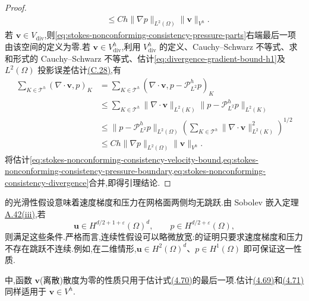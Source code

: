 \begin{proof}
\begin{equation}
\begin{aligned}
  &\leq Ch\|\nabla p\|_{L^2(\Omega)}\|\bm{v}\|_{V^h}.
\end{aligned}
\end{equation}
若 $\bm{v}\in V_{\mathrm{div}}$,则\cref{eq:stokes-nonconforming-consistency-pressure-parts}右端最后一项由该空间的定义为零.若 $\bm{v}\in V_{\mathrm{div}}^h$,利用 $V_{\mathrm{div}}^h$ 的定义、Cauchy--Schwarz 不等式、求和形式的 Cauchy--Schwarz 不等式、估计\cref{eq:divergence-gradient-bound-h1}及 $L^2(\Omega)$ 投影误差估计\hyperref[eq:appendix-c-28]{(C.28)},有
\begin{equation}\label{eq:stokes-nonconforming-consistency-divergence}
\begin{aligned}
  \sum_{K\in\mathcal{T}^h}(\nabla\cdot\bm{v},p)_K
  &=\sum_{K\in\mathcal{T}^h}
       (\nabla\cdot\bm{v},p-\mathcal{P}_{L^2}^hp)_K\\
  &\leq\sum_{K\in\mathcal{T}^h}
       \|\nabla\cdot\bm{v}\|_{L^2(K)}
       \|p-\mathcal{P}_{L^2}^hp\|_{L^2(K)}\\
  &\leq\|p-\mathcal{P}_{L^2}^hp\|_{L^2(\Omega)}
       \left(\sum_{K\in\mathcal{T}^h}
          \|\nabla\cdot\bm{v}\|_{L^2(K)}^2\right)^{1/2}\\
  &\leq Ch\|\nabla p\|_{L^2(\Omega)}\|\bm{v}\|_{V^h}.
\end{aligned}
\end{equation}
将估计\cref{eq:stokes-nonconforming-consistency-velocity-bound,eq:stokes-nonconforming-consistency-pressure-boundary,eq:stokes-nonconforming-consistency-divergence}合并,即得引理结论.
\end{proof}

\begin{note}\label{note:stokes-nonconforming-consistency-smoothness}
的光滑性假设意味着速度梯度和压力在网格面两侧均无跳跃.由 Sobolev 嵌入定理\hyperref[thm:appendix-a-42]{A.42(iii)},若
\[
  \bm{u}\in H^{d/2+1+\varepsilon}(\Omega)^d,
  \qquad
  p\in H^{d/2+\varepsilon}(\Omega),
\]
则满足这些条件.严格而言,连续性假设可以略微放宽:的证明只要求速度梯度和压力不存在跳跃不连续.例如,在二维情形,$\bm{u}\in H^2(\Omega)^d$、$p\in H^1(\Omega)$ 即可保证这一性质.
\end{note}

\begin{note}\label{note:stokes-nonconforming-consistency-test-functions}
中,函数 $\bm{v}$(离散)散度为零的性质只用于估计式\hyperref[eq:stokes-nonconforming-consistency-pressure-parts]{(4.70)}的最后一项.估计\hyperref[eq:stokes-nonconforming-consistency-velocity-bound]{(4.69)}和\hyperref[eq:stokes-nonconforming-consistency-pressure-boundary]{(4.71)}同样适用于 $\bm{v}\in V^h$.
\end{note}




